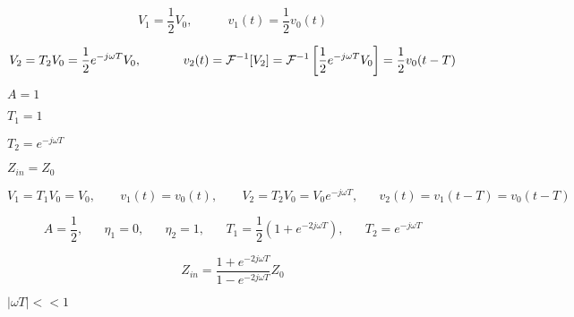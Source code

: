 {\newpage\clearpage
{}%
\begin{displaymath}	V_1=\frac{1}{2}V_0,\;\;\;\;\;\;\;\;\;\;v_1(t)=\frac{1}{2}v_0(t) \end{displaymath}%
\lthtmldisplayZ
\lthtmlcheckvsize\clearpage}

{\newpage\clearpage
{}%
\begin{displaymath}	V_2=T_2V_0=\frac{1}{2}e^{-j\omega T}V_0,\;\;\;\;\;\;\;\;\;\;\;\;
  v_2(t)={\cal F}^{-1}[V_2]={\cal F}^{-1}\left[\frac{1}{2}e^{-j\omega T}V_0\right]
  =\frac{1}{2}v_0(t-T)	\end{displaymath}%
\lthtmldisplayZ
\lthtmlcheckvsize\clearpage}

{\newpage\clearpage
{}%
$A=1$%
\lthtmlinlinemathZ
\lthtmlcheckvsize\clearpage}

{\newpage\clearpage
{}%
$T_1=1$%
\lthtmlinlinemathZ
\lthtmlcheckvsize\clearpage}

{\newpage\clearpage
{}%
$T_2=e^{-j\omega T}$%
\lthtmlinlinemathZ
\lthtmlcheckvsize\clearpage}

{\newpage\clearpage
{}%
$Z_{in}=Z_0$%
\lthtmlinlinemathZ
\lthtmlcheckvsize\clearpage}

{\newpage\clearpage
{}%
\begin{displaymath}	V_1=T_1V_0=V_0,\;\;\;\;\;\;\;v_1(t)=v_0(t),\;\;\;\;\;\;\;
  V_2=T_2V_0=V_0e^{-j\omega T},\;\;\;\;\;\; v_2(t)=v_1(t-T)=v_0(t-T)	\end{displaymath}%
\lthtmldisplayZ
\lthtmlcheckvsize\clearpage}

{\newpage\clearpage
{}%
\begin{displaymath}	A=\frac{1}{2},\;\;\;\;\;\;\eta_1=0,\;\;\;\;\;\;\eta_2=1,
  \;\;\;\;\;\;T_1=\frac{1}{2}(1+e^{-2j\omega T}),\;\;\;\;\;\;T_2=e^{-j\omega T}	\end{displaymath}%
\lthtmldisplayZ
\lthtmlcheckvsize\clearpage}

{\newpage\clearpage
{}%
\begin{displaymath} Z_{in}=\frac{1+e^{-2j\omega T}}{1-e^{-2j\omega T}}Z_0 \end{displaymath}%
\lthtmldisplayZ
\lthtmlcheckvsize\clearpage}

{\newpage\clearpage
{}%
$|\omega T| << 1$%
\lthtmlinlinemathZ
\lthtmlcheckvsize\clearpage}

